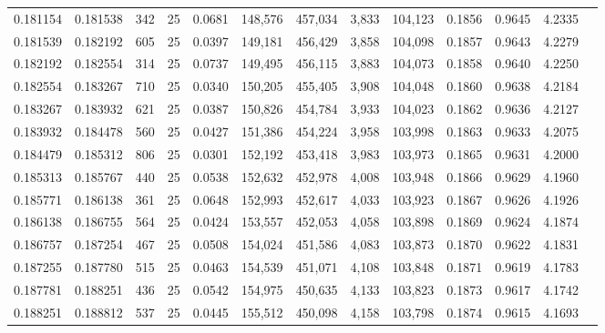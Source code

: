 \begin{tabular}{rrrrrrrrrrrrr}
0.181154 & 0.181538 &   342 &  25 &                                     0.0681 & 148,576 & 457,034 &   3,833 & 104,123 & 0.1856 & 0.9645 & 4.2335 \\
0.181539 & 0.182192 &   605 &  25 &                                     0.0397 & 149,181 & 456,429 &   3,858 & 104,098 & 0.1857 & 0.9643 & 4.2279 \\
0.182192 & 0.182554 &   314 &  25 &                                     0.0737 & 149,495 & 456,115 &   3,883 & 104,073 & 0.1858 & 0.9640 & 4.2250 \\
0.182554 & 0.183267 &   710 &  25 &                                     0.0340 & 150,205 & 455,405 &   3,908 & 104,048 & 0.1860 & 0.9638 & 4.2184 \\
0.183267 & 0.183932 &   621 &  25 &                                     0.0387 & 150,826 & 454,784 &   3,933 & 104,023 & 0.1862 & 0.9636 & 4.2127 \\
0.183932 & 0.184478 &   560 &  25 &                                     0.0427 & 151,386 & 454,224 &   3,958 & 103,998 & 0.1863 & 0.9633 & 4.2075 \\
0.184479 & 0.185312 &   806 &  25 &                                     0.0301 & 152,192 & 453,418 &   3,983 & 103,973 & 0.1865 & 0.9631 & 4.2000 \\
0.185313 & 0.185767 &   440 &  25 &                                     0.0538 & 152,632 & 452,978 &   4,008 & 103,948 & 0.1866 & 0.9629 & 4.1960 \\
0.185771 & 0.186138 &   361 &  25 &                                     0.0648 & 152,993 & 452,617 &   4,033 & 103,923 & 0.1867 & 0.9626 & 4.1926 \\
0.186138 & 0.186755 &   564 &  25 &                                     0.0424 & 153,557 & 452,053 &   4,058 & 103,898 & 0.1869 & 0.9624 & 4.1874 \\
0.186757 & 0.187254 &   467 &  25 &                                     0.0508 & 154,024 & 451,586 &   4,083 & 103,873 & 0.1870 & 0.9622 & 4.1831 \\
0.187255 & 0.187780 &   515 &  25 &                                     0.0463 & 154,539 & 451,071 &   4,108 & 103,848 & 0.1871 & 0.9619 & 4.1783 \\
0.187781 & 0.188251 &   436 &  25 &                                     0.0542 & 154,975 & 450,635 &   4,133 & 103,823 & 0.1873 & 0.9617 & 4.1742 \\
0.188251 & 0.188812 &   537 &  25 &                                     0.0445 & 155,512 & 450,098 &   4,158 & 103,798 & 0.1874 & 0.9615 & 4.1693 \\

\end{tabular}
